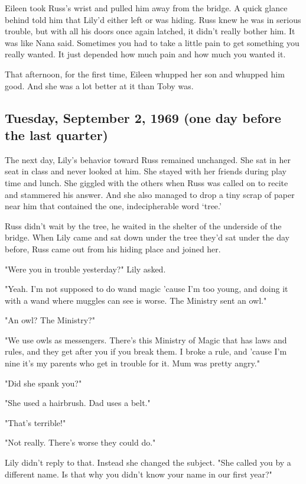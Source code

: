 Eileen took Russ's wrist and pulled him away from the bridge. A quick glance behind told him that Lily'd either left or was hiding. Russ knew he was in serious trouble, but with all his doors once again latched, it didn't really bother him. It was like Nana said. Sometimes you had to take a little pain to get something you really wanted. It just depended how much pain and how much you wanted it.

That afternoon, for the first time, Eileen whupped her son and whupped him good. And she was a lot better at it than Toby was.

\subsection{Tuesday, September 2, 1969 (one day before the last quarter)}

The next day, Lily's behavior toward Russ remained unchanged. She sat in her seat in class and never looked at him. She stayed with her friends during play time and lunch. She giggled with the others when Russ was called on to recite and stammered his answer. And she also managed to drop a tiny scrap of paper near him that contained the one, indecipherable word `tree.'

Russ didn't wait by the tree, he waited in the shelter of the underside of the bridge. When Lily came and sat down under the tree they'd sat under the day before, Russ came out from his hiding place and joined her.

"Were you in trouble yesterday?" Lily asked.

"Yeah. I'm not{\el} supposed to do wand magic 'cause I'm{\el} too young, and doing it{\el} with a wand where muggles can see is{\el} worse. The Ministry sent an{\el} owl."

"An owl? The Ministry?"

"We use owls as{\el} messengers. There's this Ministry of{\el} Magic that has laws and{\el} rules, and they get after you if you{\el} break them. I broke a{\el} rule, and 'cause I'm nine it's my{\el} parents who get in trouble{\el} for it. Mum was pretty{\el} angry."

"Did she spank you?"

"She used a{\el} hairbrush. Dad uses a{\el} belt."

"That's terrible!"

"Not{\el} really. There's worse they could{\el} do."

Lily didn't reply to that. Instead she changed the subject. "She called you by a different name. Is that why you didn't know your name in our first year?"

